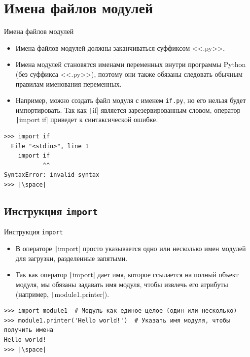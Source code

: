 \documentclass[aspectratio=169, mathserif]{beamer}	%
\begin{document}
\section{Имена файлов модулей}
\begin{frame}[fragile]{Имена файлов модулей}
\scriptsize
\begin{itemize}
\item Имена файлов модулей должны заканчиваться суффиксом <<.py>>.
\item Имена модулей становятся именами переменных внутри программы Python (без суффикса <<.py>>), поэтому они также обязаны следовать обычным правилам именования переменных.
\item Например, можно создать файл модуля с именем \texttt{if.py}, но его нельзя будет импортировать. Так как \texttt|if| является зарезервированным словом, оператор \texttt|import if| приведет к синтаксической ошибке.
\end{itemize}
\vfill
\begin{verbatim}
>>> import if
  File "<stdin>", line 1
    import if
           ^^
SyntaxError: invalid syntax
>>> |\space|
\end{verbatim}
\vfill
\end{frame}


\subsection{Инструкция \texttt{import}}
\begin{frame}[fragile]{Инструкция \texttt{import}}
\scriptsize
\begin{itemize}
	\item В операторе \texttt|import| просто указывается одно или несколько имен модулей для загрузки, разделенные запятыми.
	\item Так как оператор \texttt|import| дает имя, которое ссылается на полный объект модуля, мы обязаны задавать имя модуля, чтобы извлечь его атрибуты (например, \texttt|module1.printer|).
\end{itemize}
\vfill
\begin{verbatim}
>>> import module1  # Модуль как единое целое (один или несколько)
>>> module1.printer('Hello world!')  # Указать имя модуля, чтобы получить имена
Hello world!
>>> |\space|
\end{verbatim}
\vfill
\end{frame}
\end{document}
